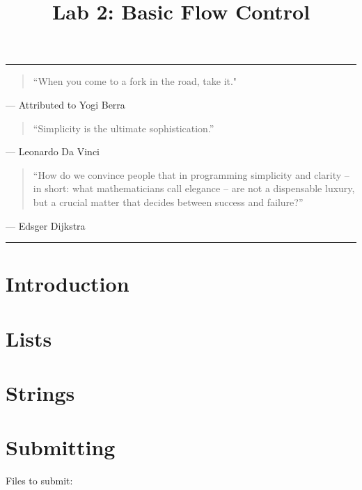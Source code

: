 \documentclass[11pt]{cselabheader}
\title{Lab 2: Basic Flow Control}
\begin{document}
\maketitle

\hrule

\begin{quotation}
``When you come to a fork in the road, take it."
\end{quotation}
\begin{flushright}
--- Attributed to Yogi Berra
\end{flushright}

\begin{quotation}
``Simplicity is the ultimate sophistication.''
\end{quotation}
\begin{flushright}
--- Leonardo Da Vinci
\end{flushright}

\begin{quotation}
``How do we convince people that in programming simplicity and clarity -- in
short: what mathematicians call elegance -- are not a dispensable luxury, but
a crucial matter that decides between success and failure?''
\end{quotation}
\begin{flushright}
--- Edsger Dijkstra
\end{flushright}

\hrule

\section{Introduction}


\section{Lists}


\section{Strings}




\pagebreak
\section{Submitting}

Files to submit:
\end{document}
